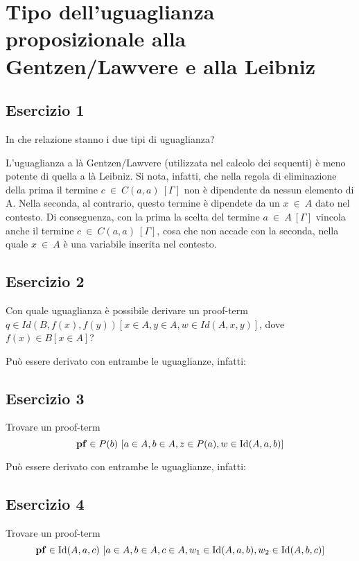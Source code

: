 \newpage
\section{Tipo dell'uguaglianza proposizionale alla Gentzen/Lawvere e alla Leibniz}
\subsection{Esercizio 1}
\begin{thm}
	In che relazione stanno i due tipi di uguaglianza?
\end{thm}
L'uguaglianza a là Gentzen/Lawvere (utilizzata nel calcolo dei sequenti) è meno potente di quella a là Leibniz. Si nota, infatti, che nella regola di eliminazione della prima il termine $c~\in~C(a,a)~[\Gamma]$ non è dipendente da nessun elemento di A. Nella seconda, al contrario, questo termine è dipendete da un $x~\in~A$ dato nel contesto. Di conseguenza, con la prima la scelta del termine $a~\in~A~[\Gamma]$ vincola anche il termine $c~\in~C(a,a)~[\Gamma]$, cosa che non accade con la seconda, nella quale $x~\in~A$ è una variabile inserita nel contesto.

\subsection{Esercizio 2}
\begin{thm}
	Con quale uguaglianza è possibile derivare un proof-term $q\in Id(B, f(x), f(y)) [x\in A, y\in A, w\in Id(A, x, y)]$, dove $f(x)\in B[x\in A]$?
\end{thm}
Può essere derivato con entrambe le uguaglianze, infatti:



\subsection{Esercizio 3}
\begin{thm} Trovare un proof-term
	\[ \mathbf{pf}\in P(b)\ [a\in A, b\in A, z\in P(a), w\in \mathrm{Id}(A, a, b)]\]
\end{thm}
Può essere derivato con entrambe le uguaglianze, infatti:



\subsection{Esercizio 4}
\begin{thm}
	Trovare un proof-term
	\[ \mathbf{pf} \in \mathrm{Id}(A, a, c)\ [a\in A, b\in A, c\in A, w_1 \in \mathrm{Id}(A, a, b), w_2 \in \mathrm{Id}(A, b, c) ] \]
\end{thm}

